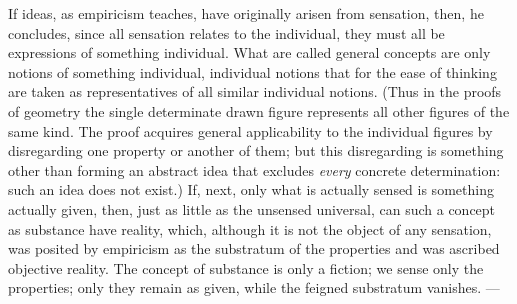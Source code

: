 If ideas, as empiricism teaches, have originally arisen from sensation,
then, he concludes, since all sensation relates to the individual, they
must all be expressions of something individual. What are called
general concepts are only notions of something individual, individual
notions that for the ease of thinking are taken as representatives of
all similar individual notions. (Thus in the proofs of geometry the
single determinate drawn figure represents all other figures of the
same kind. The proof acquires general applicability to the individual
figures by disregarding one property or another of them; but this
disregarding is something other than forming an abstract idea that
excludes \emph{every} concrete determination: such an idea does not
exist.)
If, next, only what is actually sensed is something actually
given, then, just as little as the unsensed universal, can such a
concept as substance have reality, which, although it is not the object
of any sensation, was posited by empiricism as the substratum of the
properties and was ascribed objective reality. The concept of substance
is only a fiction; we sense only the properties; only they remain as
given, while the feigned substratum vanishes. ---


